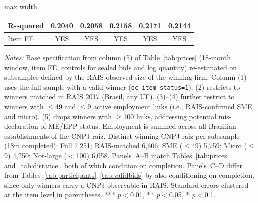 \begin{table}[htbp]
\begin{adjustbox}{max width=\textwidth}
\begin{threeparttable}
\begin{tabular}{lccccc}
R-squared & 0.2040 & 0.2058 & 0.2158 & 0.2171 & 0.2144 \\
\midrule
Item FE & YES & YES & YES & YES & YES \\
\bottomrule
\end{tabular}
\begin{tablenotes}
\small
\item \textit{Notes:} Base specification from column (5) of Table~\ref{tab:prices}
(18-month window, item FE, controls for sealed bids and log quantity) re-estimated
on subsamples defined by the RAIS-observed size of the winning firm.
Column (1) uses the full sample with a valid winner (\texttt{oc\_item\_status=1}).
(2) restricts to winners matched in RAIS 2017 (Brasil, any UF).
(3)--(4) further restrict to winners with $\leq$49 and $\leq$9 active employment
links (i.e., RAIS-confirmed SME and micro).
(5) drops winners with $\geq$100 links, addressing potential mis-declaration of ME/EPP status.
Employment is summed across all Brazilian establishments of the CNPJ raiz.
Distinct winning CNPJ-raiz per subsample (18m completed): Full 7{,}251;
RAIS-matched 6{,}606; SME ($\leq$49) 5{,}759; Micro ($\leq$9) 4{,}250;
Not-large ($<$100) 6{,}058.
Panels~A--B match Tables~\ref{tab:prices} and~\ref{tab:distance}, both of which
condition on completion. Panels~C--D differ from Tables~\ref{tab:participants}--\ref{tab:validbids}
by also conditioning on completion, since only winners carry a CNPJ observable in RAIS.
Standard errors clustered at the item level in parentheses.
*** \textit{p}$<$0.01, ** \textit{p}$<$0.05, * \textit{p}$<$0.1.
\end{tablenotes}
\end{threeparttable}
\end{adjustbox}
\end{table}
